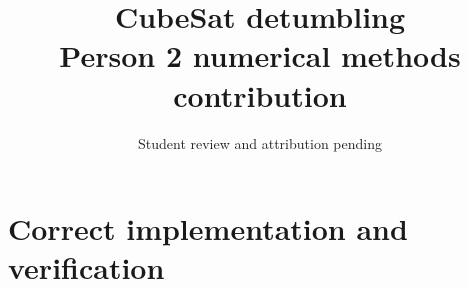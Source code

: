 \documentclass[11pt]{article}
\title{CubeSat detumbling\\Person 2 numerical methods contribution}
\author{Student review and attribution pending}
\date{}
\begin{document}
\maketitle

\section{Correct implementation and verification}

\end{document}
